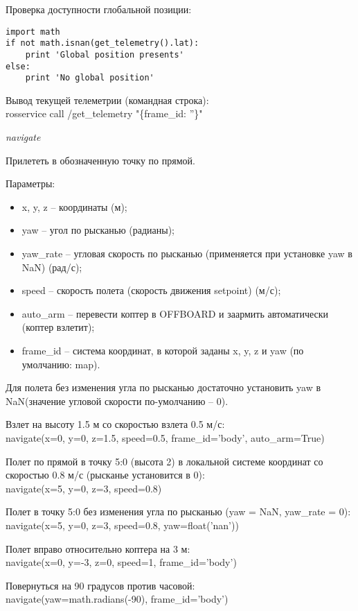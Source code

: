 Проверка доступности глобальной позиции:
\begin{verbatim}
import math
if not math.isnan(get_telemetry().lat):
	print 'Global position presents'
else:
	print 'No global position'
\end{verbatim}    

Вывод текущей телеметрии (командная строка):\\
rosservice call /get\_telemetry "\{frame\_id: ''\}"\

\textit{navigate}

Прилететь в обозначенную точку по прямой.

Параметры:
\begin{itemize}
    \item x, y, z – координаты (м);
    \item yaw – угол по рысканью (радианы);
    \item yaw\_rate – угловая скорость по рысканью (применяется при установке yaw в NaN) (рад/с);
    \item speed – скорость полета (скорость движения setpoint) (м/с);
    \item auto\_arm – перевести коптер в OFFBOARD и заармить автоматически (коптер взлетит);
    \item frame\_id – система координат, в которой заданы x, y, z и yaw (по умолчанию: map).
\end{itemize}

Для полета без изменения угла по рысканью достаточно установить yaw в NaN(значение угловой скорости по-умолчанию – 0).

Взлет на высоту 1.5 м со скоростью взлета 0.5 м/с:\\
navigate(x=0, y=0, z=1.5, speed=0.5, frame\_id='body', auto\_arm=True)

Полет по прямой в точку 5:0 (высота 2) в локальной системе координат со скоростью 0.8 м/с (рысканье установится в 0):\\
navigate(x=5, y=0, z=3, speed=0.8)

Полет в точку 5:0 без изменения угла по рысканью (yaw = NaN, yaw\_rate = 0):\\
navigate(x=5, y=0, z=3, speed=0.8, yaw=float('nan'))

Полет вправо относительно коптера на 3 м:\\
navigate(x=0, y=-3, z=0, speed=1, frame\_id='body')

Повернуться на 90 градусов против часовой:\\
navigate(yaw=math.radians(-90), frame\_id='body')

